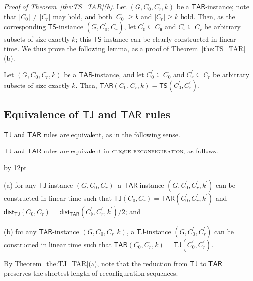 \documentclass{llncs}
\newcommand{\TS}{\mathsf{TS}}
\newcommand{\TJ}{\mathsf{TJ}}
\newcommand{\ini}{0}
\newcommand{\tar}{r}
\newcommand{\cliq}{C}
\newcommand{\TARrule}{\mathsf{TAR}}
\newcommand{\TARins}[3]{\mathsf{TAR}(#1,#2,#3)}
\newcommand{\TSins}[2]{\mathsf{TS}(#1,#2)}
\newcommand{\TJins}[2]{\mathsf{TJ}(#1,#2)}
\newcommand{\distTAR}[3]{\mathsf{dist_{TAR}}(#1,#2,#3)}
\newcommand{\distTJ}[2]{\mathsf{dist_{TJ}}(#1,#2)}
\newenvironment{listing}[1]{\begin{list}{*}{\settowidth{\labelwidth}{#1}\setlength{\leftmargin}{\labelwidth}\advance \leftmargin by 12pt
\setlength{\itemsep}{0pt}\setlength{\parsep}{0pt}\setlength{\topsep}{0pt}\setlength{\parskip}{0pt}}}{\end{list}}
\begin{document}
	\noindent
	{\em Proof of Theorem~{\rm \ref{the:TS=TAR}(}b{\rm )}.}
	Let $(G, \cliq_{\ini}, \cliq_{\tar}, k)$ be a $\TARrule$-instance; 
note that $|\cliq_{\ini}| \neq |\cliq_{\tar}|$ may hold, and both $|\cliq_{\ini}| \ge k$ and $|\cliq_{\tar}| \ge k$ hold.
	Then, as the corresponding $\TS$-instance $(G, \cliq_{\ini}^\prime, \cliq_{\tar}^\prime)$, let $\cliq_{\ini}^\prime \subseteq \cliq_{\ini}$ and $\cliq_{\tar}^\prime \subseteq \cliq_{\tar}$ be arbitrary subsets of size exactly $k$;
this $\TS$-instance can be clearly constructed in linear time.
	We thus prove the following lemma, as a proof of Theorem~\ref{the:TS=TAR}(b).
	\begin{lemma} \label{lem:TS=TARb}
	Let $(G, \cliq_{\ini}, \cliq_{\tar}, k)$ be a $\TARrule$-instance, and let $\cliq_{\ini}^\prime \subseteq \cliq_{\ini}$ and $\cliq_{\tar}^\prime \subseteq \cliq_{\tar}$ be arbitrary subsets of size exactly $k$.
	Then, $\TARins{\cliq_{\ini}}{\cliq_{\tar}}{k} = \TSins{\cliq_{\ini}^\prime}{\cliq_{\tar}^\prime}$.
	\end{lemma}

\subsection{Equivalence of $\TJ$ and $\TARrule$ rules} 

$\TJ$ and $\TARrule$ rules are equivalent, as in the following sense.
	\begin{theorem} \label{the:TJ=TAR}
	$\TJ$ and $\TARrule$ rules are equivalent in \textsc{clique reconfiguration}, as follows{\rm :} 
		\begin{listing}{aaa}
		\item[{\rm (}a{\rm )}] for any $\TJ$-instance $(G, \cliq_{\ini}, \cliq_{\tar})$, a $\TARrule$-instance $(G, \cliq_{\ini}^\prime, \cliq_{\tar}^\prime, k^\prime)$ can be constructed in linear time such that  $\TJins{\cliq_{\ini}}{\cliq_{\tar}} = \TARins{\cliq_{\ini}^\prime}{\cliq_{\tar}^\prime}{k^\prime}$ and $\distTJ{\cliq_{\ini}}{\cliq_{\tar}} = \distTAR{\cliq_{\ini}^\prime}{\cliq_{\tar}^\prime}{k^\prime} /2${\rm ;} and
		\item[{\rm (}b{\rm )}] for any $\TARrule$-instance $(G, \cliq_{\ini}, \cliq_{\tar},k)$, a $\TJ$-instance $(G, \cliq_{\ini}^\prime, \cliq_{\tar}^\prime)$ can be constructed in linear time such that $\TARins{\cliq_{\ini}}{\cliq_{\tar}}{k} = \TJins{\cliq_{\ini}^\prime}{\cliq_{\tar}^\prime}$.
		\end{listing}
	\end{theorem}
	By Theorem~\ref{the:TJ=TAR}(a), note that the reduction from $\TJ$ to $\TARrule$ preserves the shortest length of reconfiguration sequences.
\medskip
\end{document}
